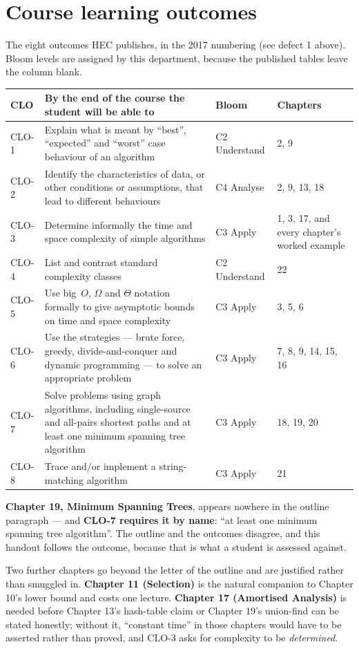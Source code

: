\section*{Course learning outcomes}

The eight outcomes HEC publishes, in the 2017 numbering (see defect 1 above).
Bloom levels are assigned by this department, because the published tables
leave the column blank.

\begin{longtable}{@{}L{1.3cm}L{7.6cm}L{2.1cm}L{3.8cm}@{}}
\toprule
{}
\textbf{CLO} & \textbf{By the end of the course the student will be able to} &
\textbf{Bloom} & \textbf{Chapters} \\
\midrule
\endhead
CLO-1 & Explain what is meant by ``best'', ``expected'' and ``worst'' case
behaviour of an algorithm & C2 Understand & 2, 9 \\
CLO-2 & Identify the characteristics of data, or other conditions or
assumptions, that lead to different behaviours & C4 Analyse & 2, 9, 13, 18 \\
CLO-3 & Determine informally the time and space complexity of simple
algorithms & C3 Apply & 1, 3, 17, and every chapter's worked example \\
CLO-4 & List and contrast standard complexity classes & C2 Understand & 22 \\
CLO-5 & Use big~$O$, $\Omega$ and $\Theta$ notation formally to give asymptotic
bounds on time and space complexity & C3 Apply & 3, 5, 6 \\
CLO-6 & Use the strategies --- brute force, greedy, divide-and-conquer and
dynamic programming --- to solve an appropriate problem & C3 Apply &
7, 8, 9, 14, 15, 16 \\
CLO-7 & Solve problems using graph algorithms, including single-source and
all-pairs shortest paths and at least one minimum spanning tree algorithm &
C3 Apply & 18, 19, 20 \\
CLO-8 & Trace and/or implement a string-matching algorithm & C3 Apply & 21 \\
\bottomrule
\end{longtable}

\begin{conceptbox}
\textbf{Chapter 19, Minimum Spanning Trees}, appears nowhere in the outline
paragraph --- and \textbf{CLO-7 requires it by name}: ``at least one minimum
spanning tree algorithm''. The outline and the outcomes disagree, and this
handout follows the outcome, because that is what a student is assessed
against.

\smallskip
Two further chapters go beyond the letter of the outline and are justified
rather than smuggled in. \textbf{Chapter 11 (Selection)} is the natural
companion to Chapter 10's lower bound and costs one lecture. \textbf{Chapter 17
(Amortised Analysis)} is needed before Chapter 13's hash-table claim or
Chapter 19's union-find can be stated honestly; without it, ``constant time''
in those chapters would have to be asserted rather than proved, and CLO-3 asks
for complexity to be \emph{determined}.
\end{conceptbox}

